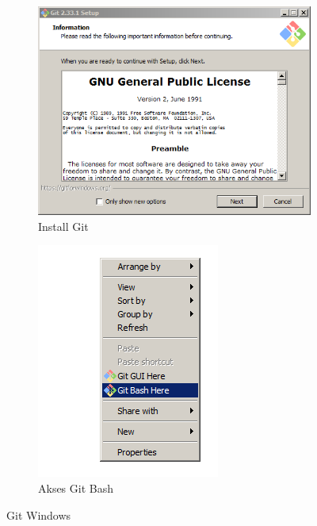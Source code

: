 \documentclass[12pt]{book}
\begin{document}
	\begin{figure}[!ht]
		\centering
		\begin{subfigure}[t]{0.5\textwidth}
			\includegraphics[width=\textwidth]{images/git/gitwininstall}
			\caption{Install Git}
		\end{subfigure}
		\begin{subfigure}[t]{0.3\textwidth}
			\includegraphics[width=\textwidth]{images/git/gitwinmenu}
			\caption{Akses Git Bash}
		\end{subfigure}
		\caption{Git Windows}
	\end{figure}
	
\end{document}
